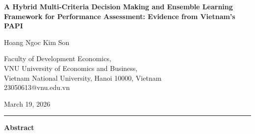 \documentclass[12pt,a4paper]{article}
\begin{document}
\begin{titlepage}
  \centering
  \vspace*{-2cm}

  {\LARGE\bfseries
    A Hybrid Multi-Criteria Decision Making and Ensemble Learning Framework for Performance Assessment: Evidence from Vietnam's PAPI
  \par}

  \vspace{1cm}

  {\large Hoang Ngoc Kim Son}
  
  \vspace{0.5cm}

  {\normalsize
    Faculty of Development Economics,\\
    VNU University of Economics and Business,\\
    Vietnam National University, Hanoi 10000, Vietnam\\[4pt]
    23050613@vnu.edu.vn
  }
  
  \vspace{2.5cm}
  
  {\small March 19, 2026}

  \vspace{0.5cm}

  \hrule

  \vspace{1cm}

  {\large\textbf{Abstract}}


\end{titlepage}
\end{document}
